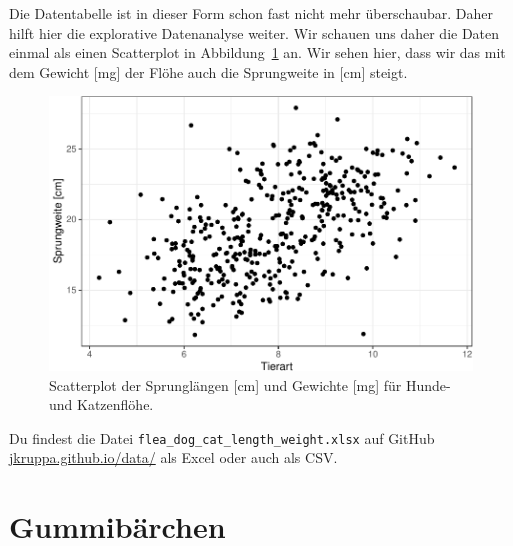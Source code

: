 \documentclass[
  letterpaper,
]{scrbook}
\begin{document}
Die Datentabelle ist in dieser Form schon fast nicht mehr überschaubar.
Daher hilft hier die explorative Datenanalyse weiter. Wir schauen uns
daher die Daten einmal als einen Scatterplot in
Abbildung~\ref{fig-example-5} an. Wir sehen hier, dass wir das mit dem
Gewicht {[}mg{]} der Flöhe auch die Sprungweite in {[}cm{]} steigt.

\begin{figure}

{\centering \includegraphics{./example-fleas-dogs-cats-length-weight_files/figure-pdf/fig-example-5-1.pdf}

}

\caption{\label{fig-example-5}Scatterplot der Sprunglängen {[}cm{]} und
Gewichte {[}mg{]} für Hunde- und Katzenflöhe.}

\end{figure}

\begin{tcolorbox}[enhanced jigsaw, coltitle=black, titlerule=0mm, bottomrule=.15mm, opacityback=0, opacitybacktitle=0.6, leftrule=.75mm, title=\textcolor{quarto-callout-tip-color}{\faLightbulb}\hspace{0.5em}{Datei für von vielen Flöhen auf Hunden und Katzen}, toprule=.15mm, bottomtitle=1mm, toptitle=1mm, left=2mm, breakable, arc=.35mm, colback=white, rightrule=.15mm, colbacktitle=quarto-callout-tip-color!10!white, colframe=quarto-callout-tip-color-frame]
Du findest die Datei \texttt{flea\_dog\_cat\_length\_weight.xlsx} auf
GitHub
\href{https://github.com/jkruppa/jkruppa.github.io/tree/master/data}{jkruppa.github.io/data/}
als Excel oder auch als CSV.
\end{tcolorbox}

\hypertarget{sec-example-gummibears}{%
\chapter{Gummibärchen}\label{sec-example-gummibears}}
\end{document}

